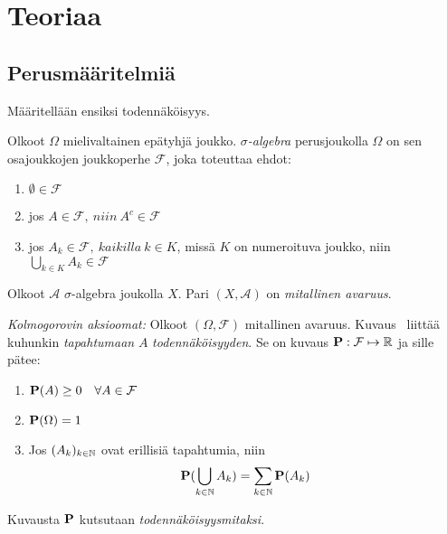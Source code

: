 


\chapter{Teoriaa}\label{teor}

\section{Perusmääritelmiä}
Määritellään ensiksi todennäköisyys. \cite{piiroinen_stokastiset_nodate, durrett_2010}

\begin{maar}
	Olkoot $\Omega$ mielivaltainen epätyhjä joukko. \emph{$\sigma$-algebra} perusjoukolla $\Omega$ on sen osajoukkojen joukkoperhe $\mathcal{F}$, joka toteuttaa ehdot:
	
	\begin{enumerate}
		\item $\emptyset\in\mathcal{F}$
		\item jos $A\in\mathcal{F},\ niin\ A^c \in\mathcal{F}$
		\item jos $A_k\in\mathcal{F},\ kaikilla\ k\in K$, missä $K$ on numeroituva joukko, niin $\bigcup_{k\in K} A_k \in \mathcal{F}$
	\end{enumerate}
\end{maar}

\begin{maar}
	Olkoot $\mathcal{A}$ $\sigma$-algebra joukolla $X$. Pari $(X, \mathcal{A})$ on \emph{mitallinen avaruus}.
\end{maar}

\begin{maar}
	\emph{Kolmogorovin aksioomat:} Olkoot $(\Omega, \mathcal{F})$ mitallinen avaruus.
	Kuvaus \pr\ liittää kuhunkin \emph{tapahtumaan} $A$ \textit{todennäköisyyden}. Se on kuvaus $\textbf{P}: \mathcal{F} \mapsto  \mathbb{R} $  ja sille pätee:
	\begin{enumerate}
		\item $\textbf{P}(A) \geq 0 \quad \forall A \in \mathcal{F}$
		\item $\textbf{P}(\Omega)=1$
		\item Jos $(A_k)_{k\in\mathbb{N}}$ ovat erillisiä tapahtumia, niin 
		\begin{displaymath}
			\textbf{P}(\bigcup_{k\in\mathbb{N}} A_k) = \sum_{k\in\mathbb{N}}\textbf{P}(A_k)
		\end{displaymath}
	\end{enumerate}
	Kuvausta $\textbf{P}$ kutsutaan \emph{todennäköisyysmitaksi}.
\end{maar}

